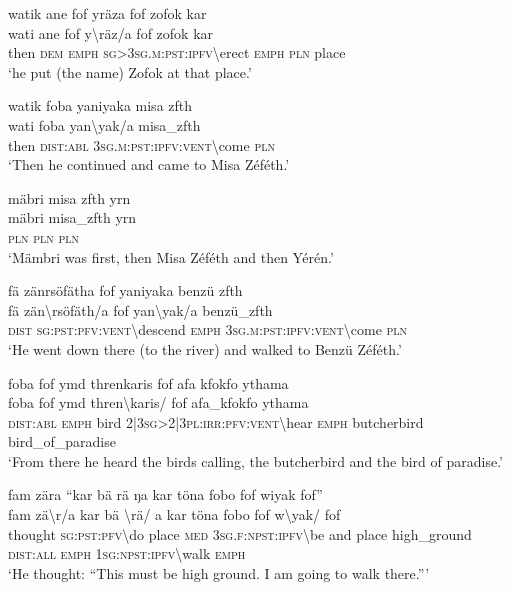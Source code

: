 \ea\label{ex:1:a3710}
watik ane fof yräza fof zofok kar\\
\gll wati	ane	fof	y{\textbackslash}räz/a	fof	zofok	kar\\
     then	\textsc{dem}	\textsc{emph}	\textsc{sg}>3\textsc{sg}.\textsc{m}:\textsc{pst}:\textsc{ipfv}{\textbackslash}erect	\textsc{emph}	\textsc{pln}	place\\
\glt `he put (the name) Zofok at that place.'
\z

\ea\label{ex:1:a3712}
watik foba yaniyaka misa zfth\\
\gll wati	foba	yan{\textbackslash}yak/a	misa\_zfth\\
     then	\textsc{dist}:\textsc{abl}	3\textsc{sg}.\textsc{m}:\textsc{pst}:\textsc{ipfv}:\textsc{vent}{\textbackslash}come	\textsc{pln}\\
\glt `Then he continued and came to Misa Zéféth.'
\z

\ea\label{ex:1:a3715}
mäbri misa zfth yrn\\
\gll mäbri	misa\_zfth	yrn\\
     \textsc{pln}	\textsc{pln}	\textsc{pln}\\
\glt `Mämbri was first, then Misa Zéféth and then Yérén.'
\z

\ea\label{ex:1:a3717}
fä zänrsöfätha fof yaniyaka benzü zfth\\
\gll fä	zän{\textbackslash}rsöfäth/a	fof	yan{\textbackslash}yak/a	benzü\_zfth\\
     \textsc{dist}	\textsc{sg}:\textsc{pst}:\textsc{pfv}:\textsc{vent}{\textbackslash}descend	\textsc{emph}	3\textsc{sg}.\textsc{m}:\textsc{pst}:\textsc{ipfv}:\textsc{vent}{\textbackslash}come	\textsc{pln}\\
\glt `He went down there (to the river) and walked to Benzü Zéféth.'
\z

\ea\label{ex:1:a3719}
foba fof ymd threnkaris fof afa kfokfo ythama\\
\gll foba	fof	ymd	thren{\textbackslash}karis/	fof	afa\_kfokfo	ythama\\
     \textsc{dist}:\textsc{abl}	\textsc{emph}	bird	2|3\textsc{sg}>2|3\textsc{pl}:\textsc{irr}:\textsc{pfv}:\textsc{vent}{\textbackslash}hear	\textsc{emph}	butcherbird	bird\_of\_paradise\\
\glt `From there he heard the birds calling, the butcherbird and the bird of paradise.'
\z

\ea\label{ex:1:a3723}
fam zära ``kar bä rä ŋa kar töna fobo fof wiyak fof''\\
\gll fam	zä{\textbackslash}r/a	kar	bä	{\textbackslash}rä/	a	kar	töna	fobo	fof	w{\textbackslash}yak/	fof\\
     thought	\textsc{sg}:\textsc{pst}:\textsc{pfv}{\textbackslash}do	place	\textsc{med}	3\textsc{sg}.\textsc{f}:\textsc{npst}:\textsc{ipfv}{\textbackslash}be	and	place	high\_ground	\textsc{dist}:\textsc{all}	\textsc{emph}	1\textsc{sg}:\textsc{npst}:\textsc{ipfv}{\textbackslash}walk	\textsc{emph}\\
\glt `He thought: ``This must be high ground. I am going to walk there.'''
\z

